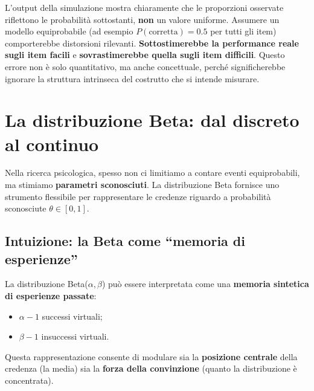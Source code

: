 \documentclass[
  letterpaper,
  DIV=11,
  numbers=noendperiod,
  oneside]{scrreprt}
\providecommand{\tightlist}{%
  \setlength{\itemsep}{0pt}\setlength{\parskip}{0pt}}
\theoremstyle{definition}
\theoremstyle{plain}
\theoremstyle{definition}
\theoremstyle{remark}
\begin{document}
L'output della simulazione mostra chiaramente che le proporzioni
osservate riflettono le probabilità sottostanti, \textbf{non} un valore
uniforme. Assumere un modello equiprobabile (ad esempio
\(P(\text{corretta}) = 0.5\) per tutti gli item) comporterebbe
distorsioni rilevanti. \textbf{Sottostimerebbe la performance reale
sugli item facili} e \textbf{sovrastimerebbe quella sugli item
difficili}. Questo errore non è solo quantitativo, ma anche concettuale,
perché significherebbe ignorare la struttura intrinseca del costrutto
che si intende misurare.

\section{La distribuzione Beta: dal discreto al
continuo}\label{la-distribuzione-beta-dal-discreto-al-continuo}

Nella ricerca psicologica, spesso non ci limitiamo a contare eventi
equiprobabili, ma stimiamo \textbf{parametri sconosciuti}. La
distribuzione Beta fornisce uno strumento flessibile per rappresentare
le credenze riguardo a probabilità sconosciute \(\theta \in [0,1]\).

\subsection{Intuizione: la Beta come ``memoria di
esperienze''}\label{intuizione-la-beta-come-memoria-di-esperienze}

La distribuzione Beta(\(\alpha, \beta\)) può essere interpretata come
una \textbf{memoria sintetica di esperienze passate}:

\begin{itemize}
\tightlist
\item
  \(\alpha - 1\) successi virtuali;
\item
  \(\beta - 1\) insuccessi virtuali.
\end{itemize}

Questa rappresentazione consente di modulare sia la \textbf{posizione
centrale} della credenza (la media) sia la \textbf{forza della
convinzione} (quanto la distribuzione è concentrata).
\end{document}
